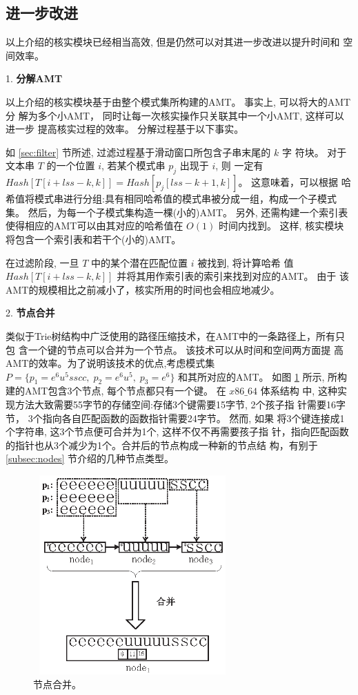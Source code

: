 \subsection{进一步改进}
\label{sec:further improments}

以上介绍的核实模块已经相当高效, 但是仍然可以对其进一步改进以提升时间和
空间效率。

\vspace{0.4cm} 1. \textbf{分解AMT}

以上介绍的核实模块基于由整个模式集所构建的AMT。 事实上, 可以将大的AMT分
解为多个小AMT， 同时让每一次核实操作只关联其中一个小AMT, 这样可以进一步
提高核实过程的效率。 分解过程基于以下事实。

如 \ref{sec:filter} 节所述, 过滤过程基于滑动窗口所包含子串末尾的 $k$ 字
符块。 对于文本串 $T$ 的一个位置 $i$, 若某个模式串 $p_j$ 出现于 $i$, 则
一定有 $Hash[T[i+lss-k,k]] = Hash[p_j[lss-k+1,k]]$。 这意味着，可以根据
哈希值将模式串进行分组:具有相同哈希值的模式串被分成一组，构成一个子模式
集。 然后，为每一个子模式集构造一棵(小的)AMT。 另外, 还需构建一个索引表
使得相应的AMT可以由其对应的哈希值在 $O(1)$ 时间内找到。 这样, 核实模块
将包含一个索引表和若干个(小的)AMT。

在过滤阶段, 一旦 $T$ 中的某个潜在匹配位置 $i$ 被找到, 将计算哈希
值 $Hash[T[i+lss-k,k]]$ 并将其用作索引表的索引来找到对应的AMT。 由于
该AMT的规模相比之前减小了，核实所用的时间也会相应地减少。

\vspace{0.4cm} 2. \textbf{节点合并}

类似于Trie树结构中广泛使用的路径压缩技术，在AMT中的一条路径上，所有只包
含一个键的节点可以合并为一个节点。 该技术可以从时间和空间两方面提
高AMT的效率。为了说明该技术的优点,考虑模式集$P=\{p_1=e^6u^5sscc,\;
p_2=e^6u^5,\; p_3=e^6\}$ 和其所对应的AMT。 如图 \ref{fig:merge} 所示,
所构建的AMT包含3个节点, 每个节点都只有一个键。 在 $x86\_64$ 体系结构
中, 这种实现方法大致需要55字节的存储空间:存储3个键需要15字节, 2个孩子指
针需要16字节， 3个指向各自匹配函数的函数指针需要24字节。 然而, 如果
将3个键连接成1个字符串, 这3个节点便可合并为1个, 这样不仅不再需要孩子指
针，指向匹配函数的指针也从3个减少为1个。合并后的节点构成一种新的节点结
构，有别于 \ref{subsec:nodes} 节介绍的几种节点类型。

\begin{figure}[H]
  \centering
  \includegraphics[height=3in, width=3in]{figures/2_MPM/node_merge}
  \caption{节点合并。}
  \label{fig:merge}
\end{figure}

